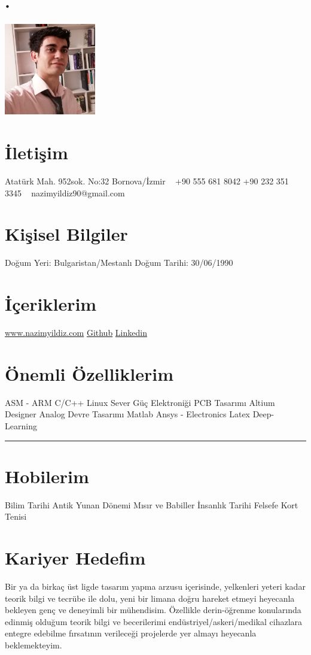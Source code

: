 \documentclass[]{cv-style} %
\begin{document}
\begin{aside}
\section{.}
\includegraphics[width=4cm]{photo.jpg}
\section{İletişim}
Atatürk Mah.
952sok. No:32
Bornova/İzmir
~
+90 555 681 8042
+90 232 351 3345
~
nazimyildiz90@gmail.com
\section{Kişisel Bilgiler}
Doğum Yeri: Bulgaristan/Mestanlı
\hspace{0.2mm}
Doğum Tarihi: 30/06/1990
\section{İçeriklerim}
\href{www.nazimyildiz.com}{www.nazimyildiz.com}
\href{https://github.com/namcho}{Github}
\href{https://www.linkedin.com/in/naz%C4%B1m-y%C4%B1ld%C4%B1z-a67b0344/}{Linkedin}
\section{Önemli Özelliklerim}
ASM - ARM
C/C++
Linux Sever
Güç Elektroniği
PCB Tasarımı
Altium Designer
Analog Devre Tasarımı
Matlab
Ansys - Electronics
Latex
Deep-Learning
\noindent\rule{2cm}{0.4pt}
\section{Hobilerim}
Bilim Tarihi
Antik Yunan Dönemi
Mısır ve Babiller
İnsanlık Tarihi
Felsefe
Kort Tenisi
\end{aside}
\section{Kariyer Hedefim}
  \vspace{-0.2cm}
Bir ya da birkaç üst ligde tasarım yapma arzusu içerisinde, yelkenleri yeteri kadar teorik bilgi ve tecrübe ile dolu, yeni bir limana doğru hareket etmeyi heyecanla bekleyen genç ve deneyimli bir mühendisim. Özellikle derin-öğrenme konularında edinmiş olduğum teorik bilgi ve becerilerimi endüstriyel/askeri/medikal cihazlara entegre edebilme fırsatının verileceği projelerde yer almayı heyecanla beklemekteyim.
\end{document}
